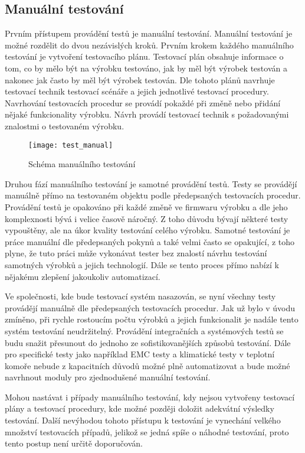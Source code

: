 \subsection{Manuální testování}
Prvním přístupem provádění testů je manuální testování. Manuální testování je možné rozdělit do dvou nezávislých kroků. Prvním krokem každého manuálního testování je vytvoření testovacího plánu. Testovací plán obsahuje informace o tom, co by mělo být na výrobku testováno, jak by měl být výrobek testován a nakonec jak často by měl být výrobek testován. Dle tohoto plánů navrhuje testovací technik testovací scénáře a jejich jednotlivé testovací procedury. Navrhování testovacích procedur se provádí pokaždé při změně nebo přidání nějaké funkcionality výrobku. Návrh provádí testovací technik s požadovanými znalostmi o testovaném výrobku.

\begin{figure}[h]
  \centering
  \texttt{[image: test\_manual]}
  \caption{Schéma manuálního testování}
  \label{fig:test_manual}
\end{figure}

Druhou fází manuálního testování je samotné provádění testů. Testy se provádějí manuálně přímo na testovaném objektu podle předepsaných testovacích procedur. Provádění testů je opakováno při každé změně ve firmwaru výrobku a dle jeho komplexnosti bývá i velice časově náročný. Z toho důvodu bývají některé testy vypouštěny, ale na úkor kvality testování celého výrobku. Samotné testování je práce manuální dle předepsaných pokynů a také velmi často se opakující, z toho plyne, že tuto práci může vykonávat tester bez znalostí návrhu testování samotných výrobků a jejich technologií. Dále se tento proces přímo nabízí k nějakému zlepšení jakoukoliv automatizací.

Ve společnosti, kde bude testovací systém nasazován, se nyní všechny testy provádějí manuálně dle předepsaných testovacích procedur. Jak už bylo v úvodu zmíněno, při rychle rostoucím počtu výrobků a jejich funkcionalit je nadále tento systém testování neudržitelný. Provádění integračních a systémových testů se budu snažit přesunout do jednoho ze sofistikovanějších způsobů testování. Dále pro specifické testy jako například EMC testy a klimatické testy v teplotní komoře nebude z kapacitních důvodů možné plně automatizovat a bude možné navrhnout moduly pro zjednodušené manuální testování.

Mohou nastávat i případy manuálního testování, kdy nejsou vytvořeny testovací plány a testovací procedury, kde možné později doložit adekvátní výsledky testování. Další nevýhodou tohoto přístupu k testování je vynechání velkého množství testovacích případů, jelikož se jedná spíše o náhodné testování, proto tento postup není určitě doporučován.

